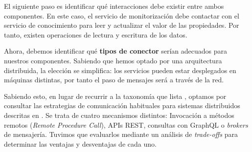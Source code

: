 El siguiente paso es identificar qué interacciones debe existir entre ambos componentes. En este caso, el servicio de monitorización debe contactar con el servicio de conocimiento para leer y actualizar el valor de las propiedades. Por tanto, existen operaciones de lectura y escritura de los datos.

Ahora, debemos identificar qué \textbf{tipos de conector} serían adecuados para nuestros componentes. Sabiendo que hemos optado por una arquitectura distribuida, la elección se simplifica: los servicios pueden estar desplegados en máquinas distintas, por tanto el paso de mensajes será a través de la red.

Sabiendo esto, en lugar de recurrir a la taxonomía que lista \cite{mehtaTaxonomySoftwareConnectors2000}, optamos por consultar las estrategias de comunicación habituales para sistemas distribuidos descritas en \cite{newmanBuildingMicroservicesDesigning2021}. Se trata de cuatro mecanismos distintos: Invocación a métodos remotos (\textit{Remote Procedure Call}), APIs REST, consultas con GraphQL o \textit{brokers} de mensajería. Tuvimos que evaluarlos mediante un análisis de \textit{trade-offs} para determinar las ventajas y desventajas de cada uno.

